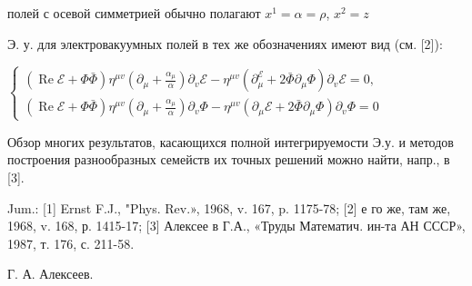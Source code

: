 \documentclass[10pt]{article}
\begin{document}
полей с осевой симметрией обычно полагают $x^{1}=\alpha=\rho$, $x^{2}=z$



Э. у. для электровакуумных полей в тех же обозначениях имеют вид (см. [2]):



$\left\{\begin{array}{l}(\operatorname{Re} \mathscr{E}+\Phi \bar{\Phi}) \eta^{\mu v}\left(\partial_{\mu}+\frac{\alpha_{\mu}}{\alpha}\right) \partial_{v} \mathscr{E}-\eta^{\mu v}\left(\partial_{\mu}^{\mathscr{E}}+2 \bar{\Phi} \partial_{\mu} \Phi\right) \partial_{v} \mathscr{E}=0, \\ (\operatorname{Re} \mathscr{E}+\Phi \bar{\Phi}) \eta^{\mu v}\left(\partial_{\mu}+\frac{\alpha_{\mu}}{\alpha}\right) \partial_{v} \Phi-\eta^{\mu v}\left(\partial_{\mu} \mathscr{E}+2 \bar{\Phi} \partial_{\mu} \Phi\right) \partial_{v} \Phi=0\end{array}\right.$



Обзор многих результатов, касающихся полной интегрируемости Э.у. и методов построения разнообразных семейств их точных решений можно найти, напр., в [3].



Jum.: [1] Ernst F.J., "Phys. Rev.», 1968, v. 167, p. 1175-78; [2] е го же, там же, 1968, v. 168, р. 1415-17; [3] Алексее в Г.А., «Труды Математич. ин-та АН СССР», 1987, т. 176, с. 211-58.



Г. А. Алексеев.
\end{document}
